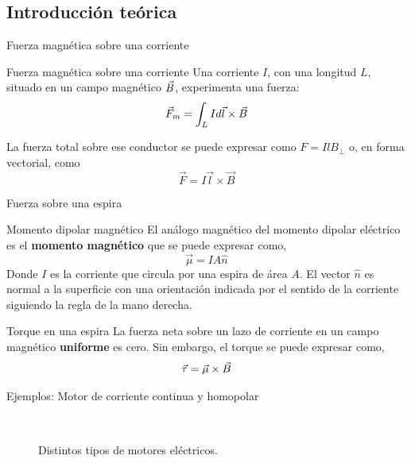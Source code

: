 \documentclass[]{presentation}
\begin{document}
\subsection{Introducción teórica}
\begin{frame}{Fuerza magnética sobre una corriente}
\begin{block}{Fuerza magnética sobre una corriente}
Una corriente $I$, con una longitud $L$, situado en un campo magnético $\vec{B}$, experimenta una fuerza:
$$
\vec{F}_m = \int_L I d\vec{l} \times \vec{B}
$$
\end{block}
La fuerza total sobre ese conductor se puede expresar como $F=I l B_\perp$ o, en forma vectorial, como
$$
\vec{F} = I \vec{l} \times \vec{B}
$$
\end{frame}

\begin{frame}{Fuerza sobre una espira}
\begin{block}{Momento dipolar magnético}
	\justifying
	El análogo magnético del momento dipolar eléctrico es el \textbf{momento magnético} que se puede expresar como,
	$$ \vec{\mu} = I A \hat{n} 	$$
	Donde $I$ es la corriente que circula por una espira de área $A$. El vector $\hat{n}$ es normal a la superficie con una orientación indicada por el sentido de la corriente siguiendo la regla de la mano derecha. 
\end{block}
\begin{block}{Torque en una espira}
La fuerza neta sobre un lazo de corriente en un campo magnético \textbf{uniforme} es cero. Sin embargo, el torque se puede expresar como,
$$ \vec{\tau} = \vec{\mu} \times \vec{B} $$
\end{block}
\end{frame}

\begin{frame}{Ejemplos: Motor de corriente continua y homopolar}
\begin{figure}
	\centering
	 \,
	\caption{Distintos tipos de motores eléctricos.}
\end{figure}
\end{frame}
\end{document}
